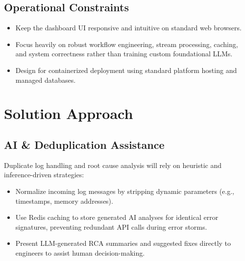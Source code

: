 \documentclass[11pt,a4paper]{article}
\begin{document}

\subsection{Operational Constraints}

\begin{itemize}[leftmargin=0.7cm]

\item Keep the dashboard UI responsive and intuitive on standard web browsers.

\item Focus heavily on robust workflow engineering, stream processing, caching, and system correctness rather than training custom foundational LLMs.

\item Design for containerized deployment using standard platform hosting and managed databases.

\end{itemize}


\section{Solution Approach}

\subsection{AI \& Deduplication Assistance}

Duplicate log handling and root cause analysis will rely on heuristic and inference-driven strategies:

\begin{itemize}[leftmargin=0.7cm]

\item Normalize incoming log messages by stripping dynamic parameters (e.g., timestamps, memory addresses).

\item Use Redis caching to store generated AI analyses for identical error signatures, preventing redundant API calls during error storms.

\item Present LLM-generated RCA summaries and suggested fixes directly to engineers to assist human decision-making.

\end{itemize}
\end{document}
